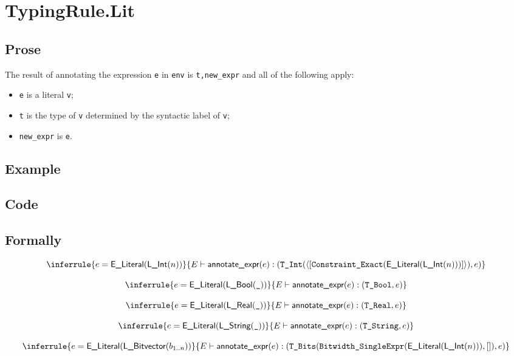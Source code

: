 \documentclass{book}
\newcommand\Ignore[0]{\texttt{\_}}
\newcommand\eliteral[1]{\textsf{E\_Literal}(#1)}
\newcommand\annotateexpr[1]{\textsf{annotate\_expr}(#1)}
\begin{document}
\section{TypingRule.Lit \label{sec:TypingRule.Lit}}

  \subsection{Prose}
  The result of annotating the expression \texttt{e} in \texttt{env} is
\texttt{t,new\_expr} and all of the following apply:
  \begin{itemize}
  \item \texttt{e} is a literal \texttt{v};
  \item \texttt{t} is the type of \texttt{v} determined by the syntactic label of \texttt{v};
  \item \texttt{new\_expr} is \texttt{e}.
  \end{itemize}

  \subsection{Example}

  \subsection{Code}
 
\begin{emptyformal}
  \subsection{Formally}
  
\[
\begin{array}{c}
\inferrule{e = \eliteral{\lint(n)}}{E \entails \annotateexpr{e}: (\TInt(\langle[\texttt{Constraint\_Exact}(\eliteral{\lint(n)})]\rangle), e)}\\
\\
\inferrule{e = \eliteral{\lbool(\Ignore)}}{E \entails \annotateexpr{e}: (\TBool, e)}\\
\\
\inferrule{e = \eliteral{\lreal(\Ignore)}}{E \entails \annotateexpr{e} : (\TReal, e)}\\
\\
\inferrule{e = \eliteral{\lstring(\Ignore)}}{E \entails \annotateexpr{e} : (\TString, e)}\\
\\
\inferrule{e = \eliteral{\lbitvector(b_{1..n})}}
{E \entails \annotateexpr{e} : (\TBits(\texttt{Bitwidth\_SingleExpr}(\eliteral{\lint(n)}), []), e)}\\
\end{array}
\]
\end{emptyformal}
\end{document}
